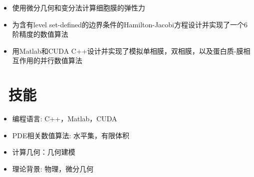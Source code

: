 \documentclass{resume}
\begin{document}
\begin{onehalfspacing}

\begin{itemize}
  \item 使用微分几何和变分法计算细胞膜的弹性力
  \item 为含有level set-defined的边界条件的Hamilton-Jacobi方程设计并实现了一个6阶精度的数值算法
  \item 用Matlab和CUDA C++设计并实现了模拟单相膜，双相膜，以及蛋白质-膜相互作用的并行数值算法
\end{itemize}
\end{onehalfspacing}







\section{\faCogs\ 技能}
\begin{itemize}[parsep=0.5ex]
  \item 编程语言: C++，Matlab，CUDA
  \item PDE相关数值算法: 水平集，有限体积
  \item 计算几何：几何建模
  \item 理论背景: 物理，微分几何
\end{itemize}

\end{document}
